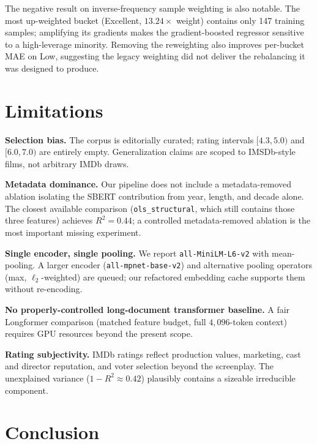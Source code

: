 \documentclass[runningheads]{llncs}
\begin{document}
The negative result on inverse-frequency sample weighting is also
notable. The most up-weighted bucket (Excellent, $13.24\times$
weight) contains only 147 training samples; amplifying its
gradients makes the gradient-boosted regressor sensitive to a
high-leverage minority. Removing the reweighting also improves
per-bucket MAE on Low, suggesting the legacy weighting did not
deliver the rebalancing it was designed to produce.

\section{Limitations}

\noindent\textbf{Selection bias.}
The corpus is editorially curated; rating intervals $[4.3, 5.0)$
and $[6.0, 7.0)$ are entirely empty. Generalization claims are
scoped to IMSDb-style films, not arbitrary IMDb draws.

\noindent\textbf{Metadata dominance.}
Our pipeline does not include a metadata-removed ablation
isolating the SBERT contribution from year, length, and decade
alone. The closest available comparison
(\texttt{ols\_structural}, which still contains those three
features) achieves $R^{2} = 0.44$; a controlled metadata-removed
ablation is the most important missing experiment.

\noindent\textbf{Single encoder, single pooling.}
We report \texttt{all-MiniLM-L6-v2} with mean-pooling. A larger
encoder (\texttt{all-mpnet-base-v2}) and alternative pooling
operators (max, $\ell_{2}$-weighted) are queued; our refactored
embedding cache supports them without re-encoding.

\noindent\textbf{No properly-controlled long-document transformer
baseline.}
A fair Longformer comparison (matched feature budget, full
$4{,}096$-token context) requires GPU resources beyond the
present scope.

\noindent\textbf{Rating subjectivity.}
IMDb ratings reflect production values, marketing, cast and
director reputation, and voter selection beyond the screenplay.
The unexplained variance ($1 - R^{2} \approx 0.42$) plausibly
contains a sizeable irreducible component.

\section{Conclusion}
\end{document}
